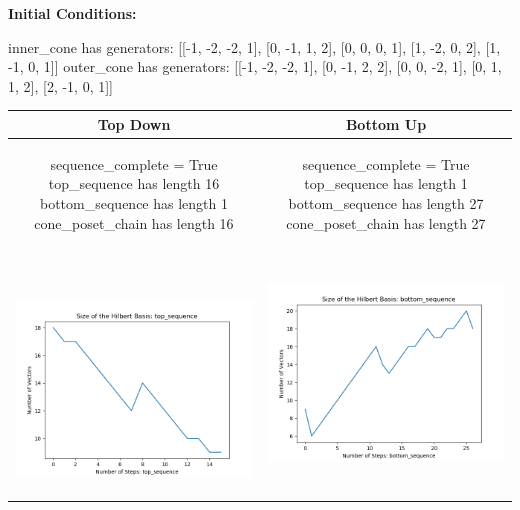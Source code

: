 \documentclass[10pt]{article}
\begin{document}
\textbf{Initial Conditions:}
\begin{SAGE}
inner_cone has generators: 
[[-1, -2, -2, 1], [0, -1, 1, 2], [0, 0, 0, 1], [1, -2, 0, 2], [1, -1, 0, 1]]
outer_cone has generators: 
[[-1, -2, -2, 1], [0, -1, 2, 2], [0, 0, -2, 1], [0, 1, 1, 2], [2, -1, 0, 1]]

\end{SAGE}
\begin{tabular}{c|c}
\textbf{Top Down} & \textbf{Bottom Up} \\ \hline  
\begin{SAGE}
	sequence_complete = True
	top_sequence has length 16
	bottom_sequence has length 1
	cone_poset_chain has length 16
\end{SAGE} 
&
\begin{SAGE}
	sequence_complete = True
	top_sequence has length 1
	bottom_sequence has length 27
	cone_poset_chain has length 27
\end{SAGE} 
\\ \hline
\
\begin{minipage}{.45\textwidth}
\includegraphics[width=\textwidth]{"DATA/4d/5 generators 2 bound I/top_sequence SIZE"}
\end{minipage} &
\begin{minipage}{.45\textwidth}
\includegraphics[width=\textwidth]{"DATA/4d/5 generators 2 bound I bottomup/bottom_sequence SIZE"}

\end{minipage}
\end{tabular}
\end{document}
